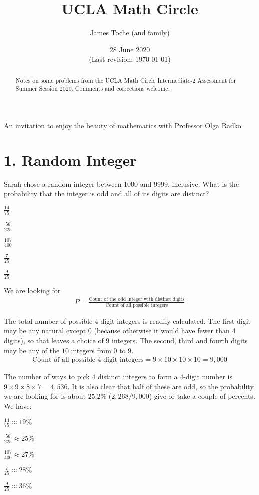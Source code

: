 \documentclass[12pt]{article}
\title{UCLA Math Circle}
\author{James Toche (and family)}
\date{28 June 2020 \\(Last revision: \today)}
\begin{document}
\epigraph{An invitation to enjoy the beauty of mathematics with Professor Olga Radko}{}
\begin{minipage}{\textwidth}
\maketitle
\begin{abstract}
Notes on some problems from the UCLA Math Circle Intermediate-2 Assessment for Summer Session 2020. Comments and corrections welcome. 
\end{abstract}
\end{minipage}

\section*{1. Random Integer}
\begin{question}
Sarah chose a random integer between 1000 and 9999, inclusive. What is the probability that the integer is odd and all of its digits are distinct?
\begin{enumerate*}
  \item $\frac{14}{75}$
  \item $\frac{56}{225}$
  \item $\frac{107}{400}$
  \item $\frac{7}{25}$
  \item $\frac{9}{25}$
\end{enumerate*}
\end{question}

We are looking for
\begin{align*}
P = \frac{\text{Count of the odd integer with distinct digits}}{\text{Count of all possible integers}}
\end{align*}

The total number of possible $4$-digit integers is readily calculated. The first digit may be any natural except $0$ (because otherwise it would have fewer than $4$ digits), so that leaves a choice of $9$ integers. The second, third and fourth digits may be any of the $10$ integers from $0$ to $9$. 
\begin{align*}
\text{Count of all possible 4-digit integers} = 9 \times 10 \times 10 \times 10 = 9,000
\end{align*}

The number of ways to pick $4$ distinct integers to form a $4$-digit number is $9\times9\times8\times7=4,536$. It is also clear that half of these are odd, so the probability we are looking for is about $25.2\%$ ($2,268/9,000$) give or take a couple of percents. We have:
\begin{question}
\begin{enumerate*}
  \item $\frac{14}{75} \approx 19\%$
  \item $\frac{56}{225} \approx 25\%$
  \item $\frac{107}{400} \approx 27\%$
  \item $\frac{7}{25} \approx 28\%$
  \item $\frac{9}{25} \approx 36\%$
\end{enumerate*}
\end{question}
\end{document}
